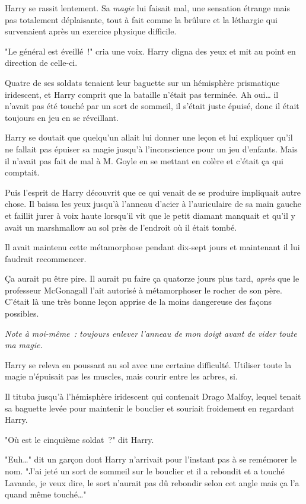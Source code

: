 Harry se rassit lentement. Sa \emph{magie} lui faisait mal, une sensation étrange mais pas totalement déplaisante, tout à fait comme la brûlure et la léthargie qui survenaient après un exercice physique difficile.

"Le général est éveillé~!" cria une voix. Harry cligna des yeux et mit au point en direction de celle-ci.

Quatre de ses soldats tenaient leur baguette sur un hémisphère prismatique iridescent, et Harry comprit que la bataille n'était pas terminée. Ah oui… il n'avait pas été touché par un sort de sommeil, il s'était juste épuisé, donc il était toujours en jeu en se réveillant.

Harry se doutait que quelqu'un allait lui donner une leçon et lui expliquer qu'il ne fallait pas épuiser sa magie jusqu'à l'inconscience pour un jeu d'enfants. Mais il n'avait pas fait de mal à M. Goyle en se mettant en colère et c'était ça qui comptait.

Puis l'esprit de Harry découvrit que ce qui venait de se produire impliquait autre chose. Il baissa les yeux jusqu'à l'anneau d'acier à l'auriculaire de sa main gauche et faillit jurer à voix haute lorsqu'il vit que le petit diamant manquait et qu'il y avait un marshmallow au sol près de l'endroit où il était tombé.

Il avait maintenu cette métamorphose pendant dix-sept jours et maintenant il lui faudrait recommencer.

Ça aurait pu être pire. Il aurait pu faire ça quatorze jours plus tard, \emph{après} que le professeur McGonagall l'ait autorisé à métamorphoser le rocher de son père. C'était là une très bonne leçon apprise de la moins dangereuse des façons possibles.

\emph{Note à moi-même~: toujours enlever l'anneau de mon doigt avant de vider toute ma magie.}

Harry se releva en poussant au sol avec une certaine difficulté. Utiliser toute la magie n'épuisait pas les muscles, mais courir entre les arbres, si.

Il tituba jusqu'à l'hémisphère iridescent qui contenait Drago Malfoy, lequel tenait sa baguette levée pour maintenir le bouclier et souriait froidement en regardant Harry.

"Où est le cinquième soldat~?" dit Harry.

"Euh…" dit un garçon dont Harry n'arrivait pour l'instant pas à se remémorer le nom. "J'ai jeté un sort de sommeil sur le bouclier et il a rebondit et a touché Lavande, je veux dire, le sort n'aurait pas dû rebondir selon cet angle mais ça l'a quand même touché…"

